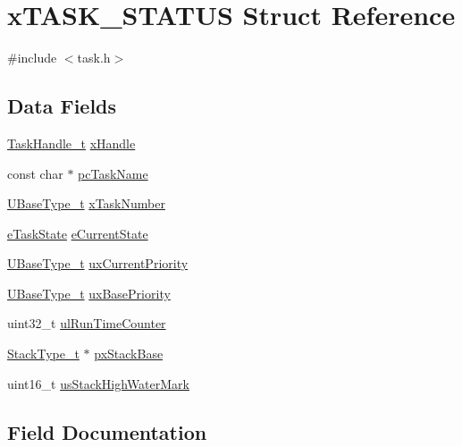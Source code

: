 \hypertarget{structxTASK__STATUS}{}\section{x\+T\+A\+S\+K\+\_\+\+S\+T\+A\+T\+US Struct Reference}
\label{structxTASK__STATUS}


{\ttfamily \#include $<$task.\+h$>$}

\subsection*{Data Fields}
\begin{DoxyCompactItemize}
\item 
\hyperlink{task_8h_ae95f44d4cfeb4a599c6cc258d241cb6b}{Task\+Handle\+\_\+t} \hyperlink{structxTASK__STATUS_ac57f825f365c3c64bba827285fe3c2a0}{x\+Handle}
\item 
const char $\ast$ \hyperlink{structxTASK__STATUS_ad272663e2560bd9ea088384a39ba6192}{pc\+Task\+Name}
\item 
\hyperlink{portmacro_8h_a646f89d4298e4f5afd522202b11cb2e6}{U\+Base\+Type\+\_\+t} \hyperlink{structxTASK__STATUS_acd44468ba37270b04f83d0833c098057}{x\+Task\+Number}
\item 
\hyperlink{task_8h_a1749369458e2282a22e862a619a3892c}{e\+Task\+State} \hyperlink{structxTASK__STATUS_a727e904e3afe49472b0fc6a4e96439cb}{e\+Current\+State}
\item 
\hyperlink{portmacro_8h_a646f89d4298e4f5afd522202b11cb2e6}{U\+Base\+Type\+\_\+t} \hyperlink{structxTASK__STATUS_a39df647234fc0d6de5852042a2741a94}{ux\+Current\+Priority}
\item 
\hyperlink{portmacro_8h_a646f89d4298e4f5afd522202b11cb2e6}{U\+Base\+Type\+\_\+t} \hyperlink{structxTASK__STATUS_a692f4c8957b7270f1579cdee63ff287e}{ux\+Base\+Priority}
\item 
uint32\+\_\+t \hyperlink{structxTASK__STATUS_a92ab83f4f376c255dedf8e06a78261f7}{ul\+Run\+Time\+Counter}
\item 
\hyperlink{portmacro_8h_a84e9a8ba132feed0b2401c1f4e2ac63c}{Stack\+Type\+\_\+t} $\ast$ \hyperlink{structxTASK__STATUS_a0ee59674d2cc57d3a5a29c777d5452ed}{px\+Stack\+Base}
\item 
uint16\+\_\+t \hyperlink{structxTASK__STATUS_a284892acd41bff7c319295687a95af6b}{us\+Stack\+High\+Water\+Mark}
\end{DoxyCompactItemize}


\subsection{Field Documentation}
